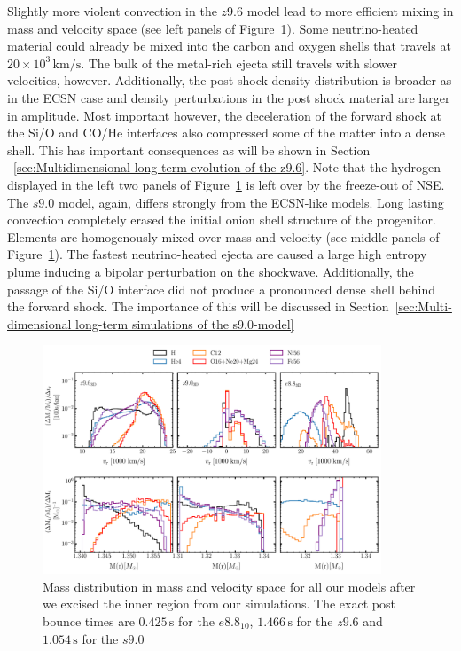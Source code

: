 \documentclass[fleqn,usenatbib]{mnras}
\newcommand{\kms}{\ensuremath{\mathrm{km/s}}\xspace}
\begin{document}
Slightly more violent convection in the $z9.6$ model lead to more efficient mixing in mass and velocity space (see left panels of Figure~\ref{fig:mdp first mapping}). Some neutrino-heated material could already be mixed into the carbon and oxygen shells that travels at $20\times 10^3\,\kms$. The bulk of the metal-rich ejecta still travels with slower velocities, however. 
Additionally, the post shock density distribution is broader as in the ECSN case and density perturbations in the post shock material are larger in amplitude. Most important however, the deceleration of the forward shock at the Si/O and CO/He interfaces also compressed some of the matter into a dense shell. This has important consequences as will be shown in Section ~\ref{sec:Multidimensional long term evolution of the z9.6}.
Note that the hydrogen displayed in the left two panels of Figure~\ref{fig:mdp first mapping} is left over by the freeze-out of NSE. 
The $s9.0$ model, again, differs strongly from the ECSN-like models. 
Long lasting convection completely erased the initial onion shell structure of the progenitor. Elements are homogenously mixed over mass and velocity (see middle panels of Figure~\ref{fig:mdp first mapping}).
The fastest neutrino-heated ejecta are caused a large high entropy plume inducing a bipolar perturbation on the shockwave.
Additionally, the passage of the Si/O interface did not produce a pronounced dense shell behind the forward shock. The importance of this will be discussed in Section~\ref{sec:Multi-dimensional long-term simulations of the s9.0-model}


\begin{figure}
 \centering
 \includegraphics[width=0.9\textwidth]{pic/z96_s9_e8_3d_massDis_mvr_and_masstime_0.pdf}
 \caption{Mass distribution in mass and velocity space for all our models after we excised the inner region from our simulations. The exact post bounce times are $0.425 \,\text{s}$ for the $e8.8_{10}$, $1.466 \,\text{s}$ for the $z9.6$ and $1.054 \,\text{s}$ for the $s9.0$ }
 \label{fig:mdp first mapping}
\end{figure}
\end{document}
